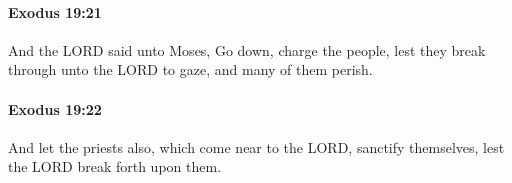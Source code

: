 		\paragraph{Exodus 19:21} %
			\label{EXODUS-19-21}

			And the LORD said unto Moses, Go down, charge the people, lest they break through unto the LORD to gaze, and many of them perish.


		\paragraph{Exodus 19:22} %
			\label{EXODUS-19-22}

			And let the priests also, which come near to the LORD, sanctify themselves, lest the LORD break forth upon them.


